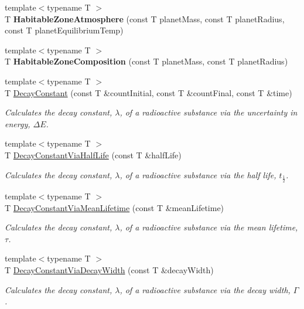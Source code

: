 \begin{DoxyCompactItemize}
\item 
{\footnotesize template$<$typename T $>$ }\\T {\bfseries Habitable\+Zone\+Atmosphere} (const T planet\+Mass, const T planet\+Radius, const T planet\+Equilibrium\+Temp)
\item 
{\footnotesize template$<$typename T $>$ }\\T {\bfseries Habitable\+Zone\+Composition} (const T planet\+Mass, const T planet\+Radius)
\item 
{\footnotesize template$<$typename T $>$ }\\T \hyperlink{group___atomic_ga904edce5aad441b4a0873b3b1a83c7f2}{Decay\+Constant} (const T \&count\+Initial, const T \&count\+Final, const T \&time)
\begin{DoxyCompactList}\small\item\em Calculates the decay constant, $\lambda$, of a radioactive substance via the uncertainty in energy, $\Delta E$. \end{DoxyCompactList}\item 
{\footnotesize template$<$typename T $>$ }\\T \hyperlink{group___atomic_ga89c04a655d9e24f976399cc8f173b7aa}{Decay\+Constant\+Via\+Half\+Life} (const T \&half\+Life)
\begin{DoxyCompactList}\small\item\em Calculates the decay constant, $\lambda$, of a radioactive substance via the half life, $t_{\frac{1}{2}}$. \end{DoxyCompactList}\item 
{\footnotesize template$<$typename T $>$ }\\T \hyperlink{group___atomic_ga260cf6dc4f926269ea8966c19dfd269f}{Decay\+Constant\+Via\+Mean\+Lifetime} (const T \&mean\+Lifetime)
\begin{DoxyCompactList}\small\item\em Calculates the decay constant, $\lambda$, of a radioactive substance via the mean lifetime, $\tau$. \end{DoxyCompactList}\item 
{\footnotesize template$<$typename T $>$ }\\T \hyperlink{group___atomic_gac0dc5d8a75657eaa2e939dd243fe4ba8}{Decay\+Constant\+Via\+Decay\+Width} (const T \&decay\+Width)
\begin{DoxyCompactList}\small\item\em Calculates the decay constant, $\lambda$, of a radioactive substance via the decay width, $\Gamma$. \end{DoxyCompactList}\item 

\end{DoxyCompactItemize}
